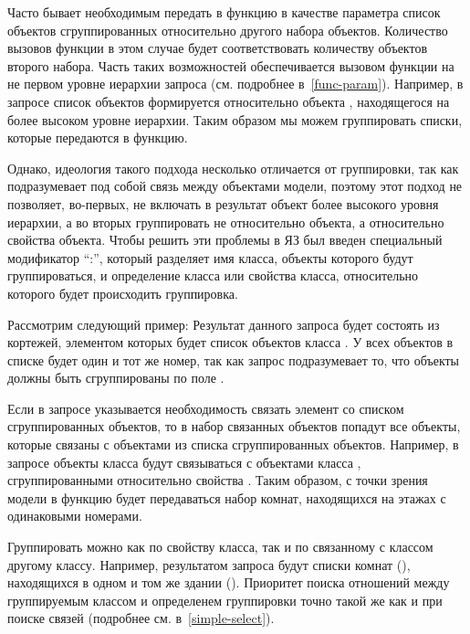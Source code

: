 \begin{center}
\end{center}
Часто бывает необходимым передать в функцию в качестве параметра список объектов сгруппированных
относительно другого набора объектов. Количество вызовов функции в этом случае будет соответствовать
количеству объектов второго набора.
Часть таких возможностей обеспечивается вызовом функции на не первом уровне 
иерархии запроса (см. подробнее в~\ref{func-param}). Например, в запросе
список объектов  формируется относительно объекта ,
находящегося на более высоком уровне иерархии. Таким образом мы можем группировать
списки, которые передаются в функцию.

Однако, идеология такого подхода несколько отличается от группировки, так как 
подразумевает под собой связь между объектами модели, поэтому этот подход
не позволяет, во-первых, не включать в результат объект более
высокого уровня иерархии, а во вторых группировать не относительно объекта, а 
относительно свойства объекта. Чтобы решить эти проблемы в ЯЗ был
введен специальный модификатор ``:'', который разделяет имя класса, объекты которого будут группироваться,
и определение класса или свойства класса, относительно которого будет происходить группировка.

Рассмотрим следующий пример:
Результат данного запроса будет состоять из кортежей, элементом которых будет
список объектов класса . У всех объектов  в списке будет
один и тот же номер, так как запрос подразумевает то, что объекты 
должны быть сгруппированы по поле .

Если в запросе указывается необходимость связать элемент со списком сгруппированных объектов,
то в набор связанных объектов попадут все объекты, которые связаны с объектами из списка
сгруппированных объектов.
Например, в запросе
объекты класса  будут связываться с объектами класса , сгруппированными относительно свойства
. Таким образом, с точки зрения модели в функцию  будет передаваться набор комнат, находящихся
на этажах с одинаковыми номерами.

Группировать можно как по свойству класса, так и по связанному с классом другому классу.
Например, результатом запроса
будут списки комнат (), находящихся в одном и том же здании ().
Приоритет поиска отношений между группируемым классом и определенем группировки
точно такой же как и при поиске связей (подробнее см. в~\ref{simple-select}).

